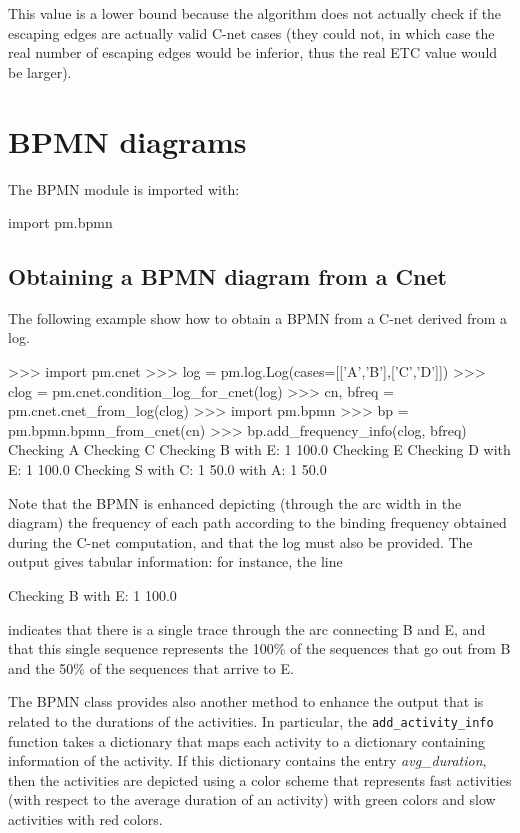 \documentclass[a4paper,10pt]{book}
\begin{document}
This value is a lower bound because the algorithm does not actually check if the escaping edges are actually valid C-net cases (they could not, in which case the real number of escaping edges would be inferior, thus the real ETC value would be larger).

\chapter{BPMN diagrams}
The BPMN module is imported with:\\
\begin{pycode}
import pm.bpmn
\end{pycode}

\section{Obtaining a BPMN diagram from a Cnet}
The following example show how to obtain a BPMN from a C-net derived from a log. \\

\begin{pycode}
>>> import pm.cnet
>>> log = pm.log.Log(cases=[['A','B'],['C','D']])
>>> clog = pm.cnet.condition_log_for_cnet(log)
>>> cn, bfreq = pm.cnet.cnet_from_log(clog)
>>> import pm.bpmn
>>> bp = pm.bpmn.bpmn_from_cnet(cn)
>>> bp.add_frequency_info(clog, bfreq)
Checking A
Checking C
Checking B
    with E: 1 100.0%
Checking E
Checking D
    with E: 1 100.0%
Checking S
    with C: 1 50.0%
    with A: 1 50.0%
\end{pycode}

Note that the BPMN is enhanced depicting (through the arc width in the diagram) the frequency of each path according to the binding frequency obtained during the C-net computation, and that the log must also be provided. The output gives tabular information: for instance, the line\\
\begin{pycode}
Checking B
    with E: 1 100.0%
\end{pycode}
indicates that there is a single trace through the arc connecting B and E, and that this single sequence represents the 100\% of the sequences that go out from B and the 50\% of the sequences that arrive to E.

The BPMN class provides also another method to enhance the output that is related to the durations of the activities. In particular, the \texttt{add\_activity\_info} function takes a dictionary that maps each activity to a dictionary containing information of the activity. If this dictionary contains the entry \emph{avg\_duration}, then the activities are depicted using a color scheme that represents fast activities (with respect to the average duration of an activity) with green colors and slow activities with red colors.
\end{document}
